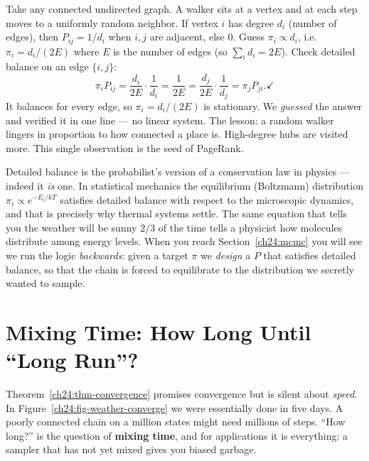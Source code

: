 \begin{example}
\label{ch24:ex-graph-walk}
Take any connected undirected graph. A walker sits at a vertex and at each step
moves to a uniformly random neighbor. If vertex $i$ has degree $d_i$ (number of
edges), then $P_{ij} = 1/d_i$ when $i,j$ are adjacent, else $0$. Guess
$\pi_i \propto d_i$, i.e.\ $\pi_i = d_i / (2E)$ where $E$ is the number of edges
(so $\sum_i d_i = 2E$). Check detailed balance on an edge $\{i,j\}$:
\[
  \pi_i P_{ij} = \frac{d_i}{2E}\cdot\frac{1}{d_i} = \frac{1}{2E}
  = \frac{d_j}{2E}\cdot\frac{1}{d_j} = \pi_j P_{ji}. \checkmark
\]
It balances for every edge, so $\pi_i = d_i/(2E)$ is stationary. We \emph{guessed}
the answer and verified it in one line --- no linear system. The lesson: a random
walker lingers in proportion to how connected a place is. High-degree hubs are
visited more. This single observation is the seed of PageRank.
\end{example}

\begin{aestheticbox}
Detailed balance is the probabilist's version of a conservation law in physics ---
indeed it \emph{is} one. In statistical mechanics the equilibrium (Boltzmann)
distribution $\pi_i \propto e^{-E_i/kT}$ satisfies detailed balance with respect
to the microscopic dynamics, and that is precisely why thermal systems settle. The
same equation that tells you the weather will be sunny $2/3$ of the time tells a
physicist how molecules distribute among energy levels. When you reach
Section~\ref{ch24:mcmc} you will see we run the logic \emph{backwards}: given a
target $\pi$ we \emph{design} a $P$ that satisfies detailed balance, so that the
chain is forced to equilibrate to the distribution we secretly wanted to sample.
\end{aestheticbox}

\section{Mixing Time: How Long Until ``Long Run''?}
\label{ch24:mixing}

Theorem~\ref{ch24:thm-convergence} promises convergence but is silent about
\emph{speed}. In Figure~\ref{ch24:fig-weather-converge} we were essentially done
in five days. A poorly connected chain on a million states might need millions of
steps. ``How long?'' is the question of \textbf{mixing time}, and for
applications it is everything: a sampler that has not yet mixed gives you biased
garbage.

